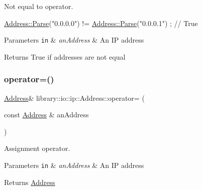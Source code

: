 Not equal to operator. 


\begin{DoxyCode}
\hyperlink{classlibrary_1_1io_1_1ip_1_1_address_af8ab0e365de3c00109b456ee94e2590b}{Address::Parse}(\textcolor{stringliteral}{"0.0.0.0"}) != \hyperlink{classlibrary_1_1io_1_1ip_1_1_address_af8ab0e365de3c00109b456ee94e2590b}{Address::Parse}(\textcolor{stringliteral}{"0.0.0.1"}) ; \textcolor{comment}{// True}
\end{DoxyCode}



\begin{DoxyParams}[1]{Parameters}
\mbox{\tt in}  & {\em an\+Address} & An IP address \\
\hline
\end{DoxyParams}
\begin{DoxyReturn}{Returns}
True if addresses are not equal 
\end{DoxyReturn}
\mbox{\label{classlibrary_1_1io_1_1ip_1_1_address_ad399ad8624416bc52c75aa1319eeb2dc}} 
\subsubsection{\texorpdfstring{operator=()}{operator=()}}
{\footnotesize\ttfamily \hyperlink{classlibrary_1_1io_1_1ip_1_1_address}{Address}\& library\+::io\+::ip\+::\+Address\+::operator= (\begin{DoxyParamCaption}\item[{const \hyperlink{classlibrary_1_1io_1_1ip_1_1_address}{Address} \&}]{an\+Address }\end{DoxyParamCaption})}



Assignment operator. 


\begin{DoxyParams}[1]{Parameters}
\mbox{\tt in}  & {\em an\+Address} & An IP address \\
\hline
\end{DoxyParams}
\begin{DoxyReturn}{Returns}
\hyperlink{classlibrary_1_1io_1_1ip_1_1_address}{Address} 
\end{DoxyReturn}
\mbox{\label{classlibrary_1_1io_1_1ip_1_1_address_aa471d7c4d4df06e473e5390a49b20b6e}} 
